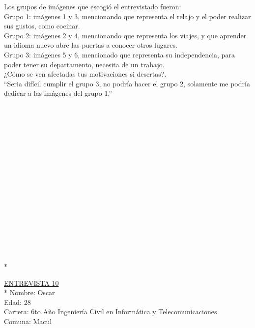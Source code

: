 Los grupos de imágenes que escogió el entrevistado fueron:\\

Grupo 1: imágenes 1 y 3, mencionando que representa el relajo y el poder realizar sus gustos, como cocinar. \\

Grupo 2: imágenes 2 y 4, mencionando que representa los viajes, y que aprender un idioma nuevo abre las puertas a conocer otros lugares.\\

Grupo 3: imágenes 5 y 6, mencionado que representa su independencia, para poder tener su departamento, necesita de un trabajo.\\


¿Cómo se ven afectadas tus motivaciones si desertas?.\\

``Seria difícil cumplir el grupo 3, no podría hacer el grupo 2, solamente me podría dedicar a las imágenes del grupo 1.'' \\
\\
\\
\\
\\
\\
\\
\\
\\
\\
\\
\\
\\
\\
\\
\\
\\
\\*

\underline {ENTREVISTA 10}\\*
Nombre: Oscar\\
Edad: 28\\
Carrera: 6to Año Ingeniería Civil en Informática y Telecomunicaciones \\
Comuna: Macul \\

